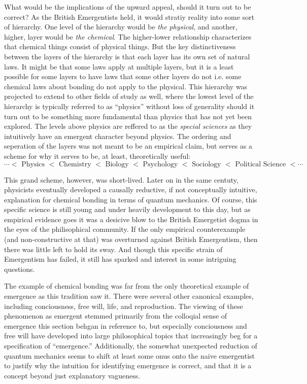 \documentclass{article}
\newcommand{\tx}[1]{\text{#1}}
\newcommand{\ti}[1]{\textit{#1}}
\begin{document}
What would be the implications of the upward appeal, should it turn out to be correct? As the British Emergentists held, it would stratiy reality into some sort of hierarchy. One level of the hierarchy would be \ti{the physical}, and another, higher, layer would be \ti{the chemical}. The higher-lower relationship characterizes that chemical things consist of physical things. But the key distinctiveness between the layers of the hierarchy is that each layer has its own set of natural laws. It might be that some laws apply at multiple layers, but it is a least possible for some layers to have laws that some other layers do not i.e. some chemical laws about bonding do not apply to the physical. This hierarchy was projected to extend to other fields of study as well, where the lowest level of the hierarchy is typically referred to as ``physics'' without loss of generality should it turn out to be something more fundamental than physics that has not yet been explored. The levels above physics are reffered to as the \ti{special sciences} as they intuitively have an emergent character beyond physics. The ordering and seperation of the layers was not meant to be an empirical claim, but serves as a scheme for why it serves to be, at least, theoretically useful:
\[
    \cdots <
    \tx{ Physics } <
    \tx{ Chemistry } <
    \tx{ Biology } <
    \tx{ Psychology } <
    \tx{ Sociology } <
    \tx{ Political Science } <
    \cdots
\]

This grand scheme, however, was short-lived. Later on in the same centuty, physicists eventually developed a causally reductive, if not conceptually intuitive, explanation for chemical bonding in terms of quantum mechanics. Of course, this specific science is still young and under heavily development to this day, but as empirical evidence goes it was a desicive blow to the British Emergetist dogma in the eyes of the philisophical community. If the only empirical counterexample (and non-constructive at that) was overturned against British Emergentism, then there was little left to hold its sway. And though this specific strain of Emergentism has failed, it still has sparked and interest in some intriguing questions.

The example of chemical bonding was far from the only theoretical example of emergence as this tradition saw it. There were several other canonical examples, including conciousness, free will, life, and reproduction. The viewing of these phenomenon as emergent stemmed primarily from the colloqial sense of emergence this section behgan in reference to, but especially conciousness and free will have developed into large philosophical topics that increasingly beg for a specification of ``emergence.'' Additionally, the somewhat unexpected reduction of quantum mechanics seems to shift at least some onus onto the naive emergentist to justify why the intuition for identifying emergence is correct, and that it is a concept beyond just explanatory vagueness.
\end{document}
